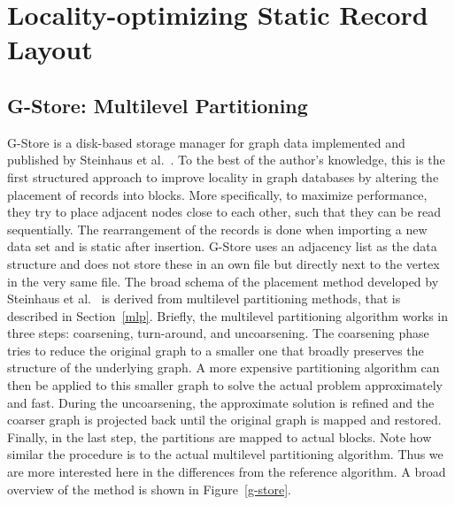 \chapter{Locality-optimizing Static Record Layout}
\section{G-Store: Multilevel Partitioning}
    G-Store is a disk-based storage manager for graph data implemented and published by Steinhaus et al.~\autocite{steinhaus2010g}. 
    To the best of the author's knowledge, this is the first structured approach to improve locality in graph databases by altering the placement of records into blocks.
    More specifically, to maximize performance, they try to place adjacent nodes close to each other, such that they can be read sequentially. 
    The rearrangement of the records is done when importing a new data set and is static after insertion.
    G-Store uses an adjacency list as the data structure and does not store these in an own file but directly next to the vertex in the very same file.
    The broad schema of the placement method developed by Steinhaus et al.~\autocite{steinhaus2010g} is derived from multilevel partitioning methods, that is described in Section~\ref{mlp}.
    Briefly, the multilevel partitioning algorithm works in three steps: coarsening, turn-around, and uncoarsening. 
    The coarsening phase tries to reduce the original graph to a smaller one that broadly preserves the structure of the underlying graph. 
    A more expensive partitioning algorithm can then be applied to this smaller graph to solve the actual problem approximately and fast.
    During the uncoarsening, the approximate solution is refined and the coarser graph is projected back until the original graph is mapped and restored.
    Finally, in the last step, the partitions are mapped to actual blocks.
    Note how similar the procedure is to the actual multilevel partitioning algorithm. 
    Thus we are more interested here in the differences from the reference algorithm.
    A broad overview of the method is shown in Figure~\ref{g-store}.
    
